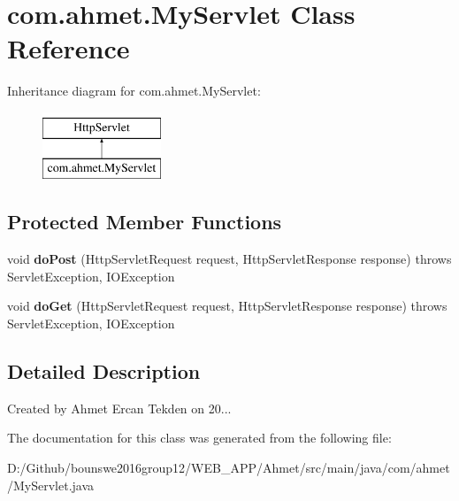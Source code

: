 \hypertarget{classcom_1_1ahmet_1_1_my_servlet}{}\section{com.\+ahmet.\+My\+Servlet Class Reference}
\label{classcom_1_1ahmet_1_1_my_servlet}
Inheritance diagram for com.\+ahmet.\+My\+Servlet\+:\begin{figure}[H]
\begin{center}
\leavevmode
\includegraphics[height=2.000000cm]{classcom_1_1ahmet_1_1_my_servlet}
\end{center}
\end{figure}
\subsection*{Protected Member Functions}
\begin{DoxyCompactItemize}
\item 
void {\bfseries do\+Post} (Http\+Servlet\+Request request, Http\+Servlet\+Response response)  throws Servlet\+Exception, I\+O\+Exception \hypertarget{classcom_1_1ahmet_1_1_my_servlet_ab8741db8d9ad6616215b2a721aff4306}{}\label{classcom_1_1ahmet_1_1_my_servlet_ab8741db8d9ad6616215b2a721aff4306}

\item 
void {\bfseries do\+Get} (Http\+Servlet\+Request request, Http\+Servlet\+Response response)  throws Servlet\+Exception, I\+O\+Exception \hypertarget{classcom_1_1ahmet_1_1_my_servlet_a912a8f77a78c9d08b8df1bbd3e4a20ec}{}\label{classcom_1_1ahmet_1_1_my_servlet_a912a8f77a78c9d08b8df1bbd3e4a20ec}

\end{DoxyCompactItemize}


\subsection{Detailed Description}
Created by Ahmet Ercan Tekden on 20... 

The documentation for this class was generated from the following file\+:\begin{DoxyCompactItemize}
\item 
D\+:/\+Github/bounswe2016group12/\+W\+E\+B\+\_\+\+A\+P\+P/\+Ahmet/src/main/java/com/ahmet/My\+Servlet.\+java\end{DoxyCompactItemize}
